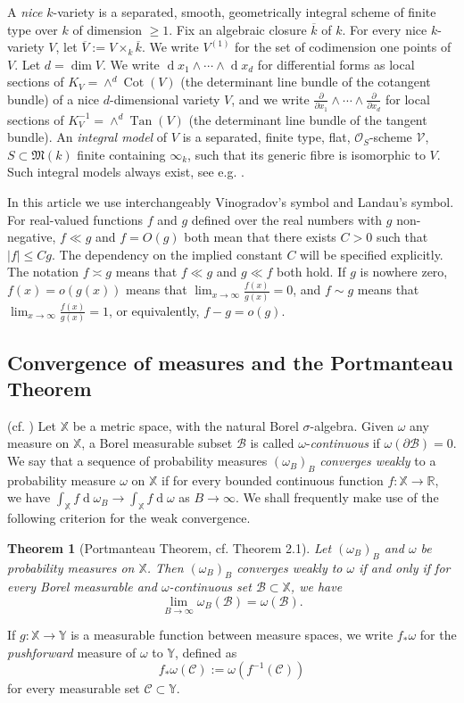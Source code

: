 \documentclass[11pt,letterpaper]{amsart}
\newcommand{\BR}{{\mathbb {R}}}
\newcommand{\BX}{{\mathbb {X}}}
\newcommand{\BY}{{\mathbb {Y}}}
\newcommand{\CB}{{\mathcal {B}}}
\newcommand{\CC}{{\mathcal {C}}}
\newcommand{\CO}{{\mathcal {O}}}
\newcommand{\CV}{{\mathcal {V}}}
\theoremstyle{plain}
\numberwithin{equation}{section}
\newtheorem{theorem}{Theorem}[section]
\theoremstyle{definition}
\theoremstyle{remark}
\begin{document}
A \emph{nice} $k$-variety is a separated, smooth, geometrically integral scheme of finite type over $k$ of dimension $\geqslant 1$. Fix an algebraic closure $\overline{k}$ of $k$. For every nice $k$-variety $V$, let $\overline{V}:=V\times_k\overline{k}$. 
We write $V^{(1)}$ for the set of codimension one points of $V$.
Let $d=\dim V$. We write $\operatorname{d}x_1\wedge\cdots\wedge\operatorname{d}x_d$ for differential forms as local sections of $K_V=\wedge^d\operatorname{Cot} (V)$ (the determinant line bundle of the cotangent bundle) of a nice $d$-dimensional variety $V$, and we write $\frac{\partial}{\partial x_1}\wedge\cdots\wedge \frac{\partial}{\partial x_d}$ for local sections of $K_V^{-1}=\wedge^d\operatorname{Tan} (V)$ (the determinant line bundle of the tangent bundle). An \emph{integral model} of $V$ is a separated, finite type, flat, $\CO_S$-scheme $\CV$, $S\subset\mathfrak{M}(k)$ finite containing $\infty_k$, such that its generic fibre is isomorphic to $V$.  Such integral models always exist, see e.g. \cite[Proposition 4.2, Lemma 4.3]{Salberger}.



In this article we use interchangeably Vinogradov's symbol and Landau's symbol. For real-valued functions $f$ and $g$ defined over the real numbers with $g$ non-negative,  $f \ll g$ and  $f=O(g)$ both mean that there exists $C>0$ such that $|f|\leqslant Cg$. The dependency on the implied constant $C$ will be specified explicitly. The notation $f\asymp g$ means that $f\ll g$ and $g\ll f$ both hold. If $g$ is nowhere zero, $f(x)=o(g(x))$ means that $\lim_{x\to \infty}\frac{f(x)}{g(x)}=0$, and $f\sim g$ means that $\lim_{x\to \infty}\frac{f(x)}{g(x)}=1$, or equivalently, $f-g=o(g)$.



\subsection{Convergence of measures and the Portmanteau Theorem}\label{se:convergence} (cf. \cite{Billingsley})
Let $\BX$ be a metric space, with the natural Borel $\sigma$-algebra.
Given $\omega$ any measure on $\BX$, a Borel measurable subset $\CB$ is called $\omega$-\emph{continuous} if $\omega(\partial \CB)=0$. 
We say that a sequence of probability measures $(\omega_B)_B$ \emph{converges  weakly} to a probability measure $\omega$  on $\BX$ if for every bounded continuous function $f: \BX\to\BR$, we have $\int_{\BX}f\operatorname{d} \omega_B\to \int_{\BX}f\operatorname{d}\omega$ as $B\to\infty$.
We shall frequently make use of the following criterion for the weak convergence. 
\begin{theorem}[Portmanteau Theorem, cf. \cite{Billingsley} Theorem 2.1]\label{thm:portmanteau}
	Let $(\omega_B)_B$ and $\omega$ be probability measures on $\BX$. Then  $(\omega_B)_B$ converges  weakly to $\omega$ if and only if for every Borel measurable  and $\omega$-continuous set $\CB\subset\BX$, we have
	$$\lim_{B\to\infty}\omega_B(\CB)=\omega(\CB).$$
\end{theorem}
If $g:\BX\to\BY$ is a measurable function between measure spaces, we write $f_*\omega$ for the \emph{pushforward} measure  of $\omega$ to $\BY$, defined as $$f_*\omega(\CC):=\omega(f^{-1}(\CC))$$ for every measurable set $\CC\subset \BY$.
\end{document}
